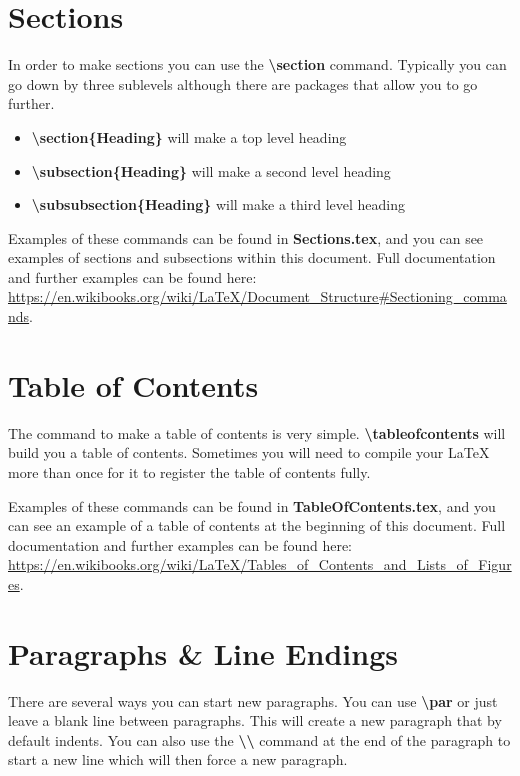 \documentclass[10pt, titlepage]{article}
\begin{document}
\AISDTitlePage{}

\thispagestyle{empty}
\tableofcontents
\newpage

\section{Sections}
In order to make sections you can use the \textbf{\textbackslash section} command. Typically you can go down by three sublevels although there are packages that allow you to go further. 

\begin{itemize}
	\item{\textbf{\textbackslash section\{Heading\}} will make a top level heading}
	\item{\textbf{\textbackslash subsection\{Heading\}} will make a second level heading}
	\item{\textbf{\textbackslash subsubsection\{Heading\}} will make a third level heading}
\end{itemize}

Examples of these commands can be found in \textbf{Sections.tex}, and you can see examples of sections and subsections within this document. Full documentation and further examples can be found here: \url{https://en.wikibooks.org/wiki/LaTeX/Document_Structure#Sectioning_commands}.

\section{Table of Contents}
The command to make a table of contents is very simple. \textbf{\textbackslash tableofcontents} will build you a table of contents. Sometimes you will need to compile your LaTeX more than once for it to register the table of contents fully. 

Examples of these commands can be found in \textbf{TableOfContents.tex}, and you can see an example of a table of contents at the beginning of this document. Full documentation and further examples can be found here: \url{https://en.wikibooks.org/wiki/LaTeX/Tables_of_Contents_and_Lists_of_Figures}.

\section{Paragraphs \& Line Endings}
There are several ways you can start new paragraphs. You can use \textbf{\textbackslash par} or just leave a blank line between paragraphs. This will create a new paragraph that by default indents. You can also use the \textbf{\textbackslash \textbackslash} command at the end of the paragraph to start a new line which will then force a new paragraph. 
\end{document}
